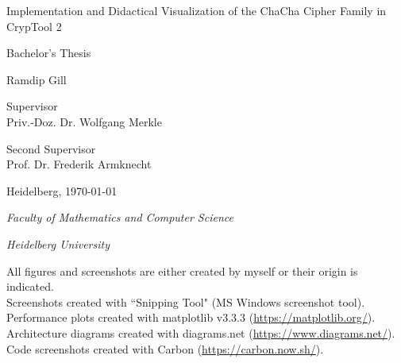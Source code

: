 \documentclass[11pt]{mimosis}
\newcommand*{\titleGP}{\begingroup %
\centering %
\vspace*{\baselineskip} %


{\huge{Implementation and Didactical Visualization of the ChaCha Cipher Family in CrypTool 2}\par} %


\vspace*{2\baselineskip}

{\Large Bachelor's Thesis\\[\baselineskip]} %
\vspace*{\baselineskip}

{\LARGE Ramdip Gill\\[\baselineskip]} %

\vspace*{\baselineskip} %

Supervisor\\
{\large  Priv.-Doz. Dr. Wolfgang Merkle\\[\baselineskip]} %

Second Supervisor\\
{\large  Prof. Dr. Frederik Armknecht\\[\baselineskip]} %

\vfil

Heidelberg,  \today \par %

\vspace*{\baselineskip}

{\itshape Faculty of Mathematics and Computer Science\par} %
{\itshape Heidelberg University\par} %

\endgroup}
\theoremstyle{remark}
\begin{document}
\frontmatter
\thispagestyle{empty}
\titleGP
\cleardoublepage
\pagestyle{scrheadings}




\tableofcontents
\mainmatter






\backmatter


\label{sec:index}

\printbibliography
\listoffigures

\noindent
All figures and screenshots are either created by myself or their origin is indicated.\\
Screenshots created with ``Snipping Tool" (MS Windows screenshot tool).\\
Performance plots created with matplotlib v3.3.3 (\url{https://matplotlib.org/}).\\
Architecture diagrams created with diagrams.net (\url{https://www.diagrams.net/}). \\
Code screenshots created with Carbon (\url{https://carbon.now.sh/}).
\end{document}
